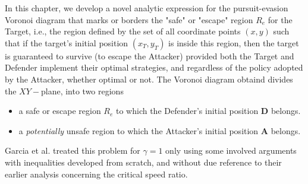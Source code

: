 \label{voronoi}

In this chapter, we develop a novel analytic expression for the pursuit-evasion Voronoi diagram \cite{pachter2014active} that marks or borders the "safe" or "escape" region $R_{e}$ for the Target, i.e., the region defined by the set of all coordinate points $(x,y)$ such that if the target's initial position $(x_{T},y_{T})$ is inside this region, then the target is guaranteed to survive (to escape the Attacker) provided both the Target and Defender implement their optimal strategies, and regardless of the policy adopted by the Attacker, whether optimal or not.
The Voronoi diagram obtaind divides the $XY-$plane, into two regions 
\begin{itemize}
\item a safe or escape region $R_{e}$ to which the Defender's initial position $\boldsymbol{D}$ belongs.
\item a \textit{potentially} unsafe region to which the Attacker's initial position $\boldsymbol{A}$ belongs.
\end{itemize}
Garcia et al. \cite{pachter2014active} treated this problem for $\gamma=1$ only using some involved arguments with inequalities developed from scratch, and without due reference to their earlier analysis concerning the critical speed ratio.\\


